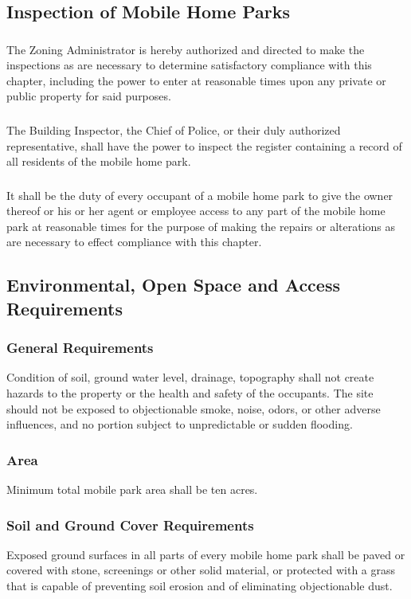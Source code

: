 \subsection{Inspection of Mobile Home Parks}
\subsubsection{}
The Zoning Administrator is hereby authorized and directed to make the inspections as are necessary to determine satisfactory compliance with this chapter, including the power to enter at reasonable times upon any private or public property for said purposes.
\subsubsection{}
The Building Inspector, the Chief of Police, or their duly authorized representative, shall have the power to inspect the register containing a record of all residents of the mobile home park.
\subsubsection{}
It shall be the duty of every occupant of a mobile home park to give the owner thereof or his or her agent or employee access to any part of the mobile home park at reasonable times for the purpose of making the repairs or alterations as are necessary to effect compliance with this chapter.
\subsection{Environmental, Open Space and Access Requirements}
\subsubsection{General Requirements}
Condition of soil, ground water level, drainage, topography shall not create hazards to the property or the health and safety of the occupants. The site should not be exposed to objectionable smoke, noise, odors, or other adverse influences, and no portion subject to unpredictable or sudden flooding.
\subsubsection{Area}
Minimum total mobile park area shall be ten acres.
\subsubsection{Soil and Ground Cover Requirements}
Exposed ground surfaces in all parts of every mobile home park shall be paved or covered with stone, screenings or other solid material, or protected with a grass that is capable of preventing soil erosion and of eliminating objectionable dust.
